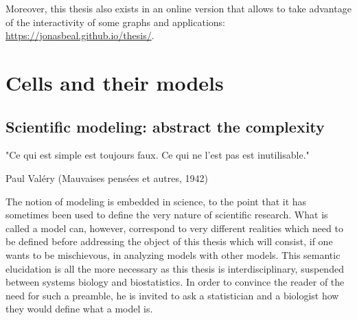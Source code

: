 \documentclass[a4paper,12pt,twoside,onecolumn,openright,final,oldfontcommands]{memoir}
\newcommand{\initial}[1]{
	\lettrine[lines=3,lhang=0.33,nindent=0em]{
		\color{gray}
     		{\textsc{#1}}}{}}
\newcommand\blankpage{%
    \null
    \thispagestyle{empty}%
    \newpage
    }
\newcommand{\clearemptydoublepage}{\newpage{\thispagestyle{empty}\cleardoublepage}}
\begin{document}
Moreover, this thesis also exists in an online version that allows to
take advantage of the interactivity of some graphs and applications:
\url{https://jonasbeal.github.io/thesis/}.

\clearemptydoublepage

\renewcommand{\contentsname}{Table of contents}


\tableofcontents*
{}
\newpage

\listoftables
{}
\newpage

\listoffigures
{}
\newpage

\blankpage


\part{Cells and their
models}\label{part-cells-and-their-models}

\chapter{Scientific modeling: abstract the
complexity}\label{scientific-modeling-abstract-the-complexity}

\epigraph{"Ce qui est simple est toujours faux. Ce qui ne l'est pas est inutilisable."}{Paul Valéry (Mauvaises pensées et autres, 1942)}

\initial{T}he notion of modeling is embedded in science, to the point
that it has sometimes been used to define the very nature of scientific
research. What is called a model can, however, correspond to very
different realities which need to be defined before addressing the
object of this thesis which will consist, if one wants to be
mischievous, in analyzing models with other models. This semantic
elucidation is all the more necessary as this thesis is
interdisciplinary, suspended between systems biology and biostatistics.
In order to convince the reader of the need for such a preamble, he is
invited to ask a statistician and a biologist how they would define what
a model is.
\end{document}
